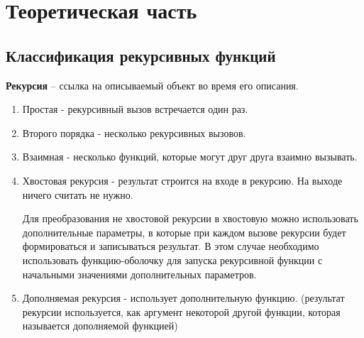 \documentclass[a4paper,oneside,12pt]{extreport}
\begin{document}

\newpage

\section*{Теоретическая часть}

\subsection*{Классификация рекурсивных функций}

\textbf{Рекурсия} -- ссылка на описываемый объект во время его описания.

\begin{enumerate}
    \item Простая - рекурсивный вызов встречается один раз.
    \item Второго порядка - несколько рекурсивных вызовов.
    \item Взаимная - несколько функций, которые могут друг друга взаимно вызывать.
    \item Хвостовая рекурсия - результат строится на входе в рекурсию.
    На выходе ничего считать не нужно.
    
    Для преобразования не хвостовой рекурсии в хвостовую можно использовать
    дополнительные параметры, в которые при каждом вызове рекурсии будет 
    формироваться и записываться результат.
    В этом случае необходимо использовать функцию-оболочку для запуска рекурсивной функции с начальными значениями дополнительных параметров.
 
    \item Дополняемая рекурсия - использует дополнительную функцию.
    (результат рекурсии используется, как аргумент некоторой другой функции, которая называется дополняемой функцией)
\end{enumerate}
\end{document}
